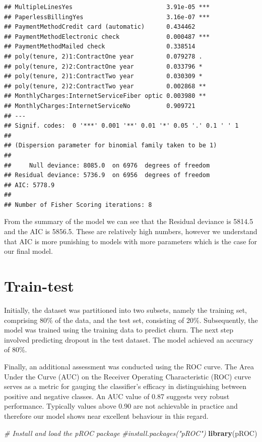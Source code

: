 \documentclass[
]{article}
\newenvironment{Shaded}{\begin{snugshade}}{\end{snugshade}}
\newcommand{\CommentTok}[1]{\textcolor[rgb]{0.56,0.35,0.01}{\textit{#1}}}
\newcommand{\FunctionTok}[1]{\textcolor[rgb]{0.13,0.29,0.53}{\textbf{#1}}}
\newcommand{\NormalTok}[1]{#1}
\begin{document}
\begin{verbatim}
## MultipleLinesYes                          3.91e-05 ***
## PaperlessBillingYes                       3.16e-07 ***
## PaymentMethodCredit card (automatic)      0.434462    
## PaymentMethodElectronic check             0.000487 ***
## PaymentMethodMailed check                 0.338514    
## poly(tenure, 2)1:ContractOne year         0.079278 .  
## poly(tenure, 2)2:ContractOne year         0.033796 *  
## poly(tenure, 2)1:ContractTwo year         0.030309 *  
## poly(tenure, 2)2:ContractTwo year         0.002868 ** 
## MonthlyCharges:InternetServiceFiber optic 0.003980 ** 
## MonthlyCharges:InternetServiceNo          0.909721    
## ---
## Signif. codes:  0 '***' 0.001 '**' 0.01 '*' 0.05 '.' 0.1 ' ' 1
## 
## (Dispersion parameter for binomial family taken to be 1)
## 
##     Null deviance: 8085.0  on 6976  degrees of freedom
## Residual deviance: 5736.9  on 6956  degrees of freedom
## AIC: 5778.9
## 
## Number of Fisher Scoring iterations: 8
\end{verbatim}

From the summary of the model we can see that the Residual deviance is
5814.5 and the AIC is 5856.5. These are relatively high numbers, however
we understand that AIC is more punishing to models with more parameters
which is the case for our final model.

\hypertarget{train-test}{%
\section{Train-test}\label{train-test}}

Initially, the dataset was partitioned into two subsets, namely the
training set, comprising 80\% of the data, and the test set, consisting
of 20\%. Subsequently, the model was trained using the training data to
predict churn. The next step involved predicting dropout in the test
dataset. The model achieved an accuracy of 80\%.

Finally, an additional assessment was conducted using the ROC curve. The
Area Under the Curve (AUC) on the Receiver Operating Characteristic
(ROC) curve serves as a metric for gauging the classifier's efficacy in
distinguishing between positive and negative classes. An AUC value of
0.87 suggests very robust performance. Typically values above 0.90 are
not achievable in practice and therefore our model shows near excellent
behaviour in this regard.

\begin{Shaded}
\begin{Highlighting}[]
\CommentTok{\# Install and load the pROC package}
\CommentTok{\#install.packages("pROC")}
\FunctionTok{library}\NormalTok{(pROC)}
\end{Highlighting}
\end{Shaded}
\end{document}
